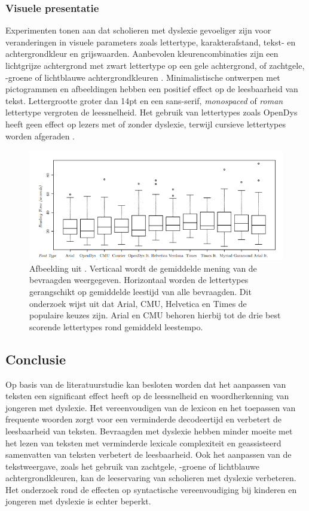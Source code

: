\subsubsection{Visuele presentatie}
Experimenten tonen aan dat scholieren met dyslexie gevoeliger zijn voor veranderingen in visuele parameters zoals lettertype, karakterafstand, tekst- en achtergrondkleur en grijswaarden. Aanbevolen kleurencombinaties zijn een lichtgrijze achtergrond met zwart lettertype op een gele achtergrond, of zachtgele, -groene of lichtblauwe achtergrondkleuren \autocite{Rello2015, Bezem2016, Rello2017}. Minimalistische ontwerpen met pictogrammen en afbeeldingen hebben een positief effect op de leesbaarheid van tekst. Lettergrootte groter dan 14pt en een sans-serif, \textit{monospaced} of \textit{roman} lettertype vergroten de leessnelheid. Het gebruik van lettertypes zoals OpenDys heeft geen effect op lezers met of zonder dyslexie, terwijl cursieve lettertypes worden afgeraden \autocite{Rello2013b, Rello2015}.

\begin{figure}[H]
	\includegraphics{img/fonts-readability.png}
	\caption{Afbeelding uit \textcite{Rello2013b}. Verticaal wordt de gemiddelde mening van de bevraagden weergegeven. Horizontaal worden de lettertypes gerangschikt op gemiddelde leestijd van alle bevraagden. Dit onderzoek wijst uit dat Arial, CMU, Helvetica en Times de populaire keuzes zijn. Arial en CMU behoren hierbij tot de drie best scorende lettertypes rond gemiddeld leestempo.}
\end{figure}

\subsection{Conclusie}
Op basis van de literatuurstudie kan besloten worden dat het aanpassen van teksten een significant effect heeft op de leessnelheid en woordherkenning van jongeren met dyslexie. Het vereenvoudigen van de lexicon en het toepassen van frequente woorden zorgt voor een verminderde decodeertijd en verbetert de leesbaarheid van teksten. Bevraagden met dyslexie hebben minder moeite met het lezen van teksten met verminderde lexicale complexiteit en geassisteerd samenvatten van teksten verbetert de leesbaarheid. Ook het aanpassen van de tekstweergave, zoals het gebruik van zachtgele, -groene of lichtblauwe achtergrondkleuren, kan de leeservaring van scholieren met dyslexie verbeteren. Het onderzoek rond de effecten op syntactische vereenvoudiging bij kinderen en jongeren met dyslexie is echter beperkt.

